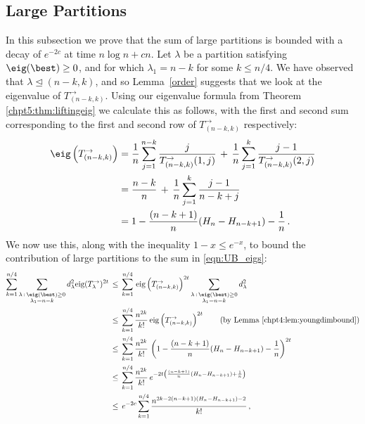 \documentclass[11pt]{report}
\begin{document}
\subsection{Large Partitions}
In this subsection we prove that the sum of large partitions is bounded 
with a decay of $e^{-2c}$ at time $n \log n +cn$. 
Let $\lambda$ be a partition satisfying $\eig(\best)\ge 0$, and for which $\lambda_1 = n-k$ for some  $k\leq n/4$. We have observed that $\lambda \trianglelefteq(n-k,k)$, and so Lemma~\ref{order} suggests that we look at the eigenvalue of $T_{(n-k,k)}^{\rightarrow}$. Using our eigenvalue formula from Theorem \ref{chpt5:thm:liftingeig} we calculate this as follows, with the first and second sum corresponding to the first and second row of $T_{(n-k,k)}^{\rightarrow}$ respectively:
\begin{align}
\eig\left(T_{(n-k,k)}^{\rightarrow}\right) & = \frac 1n \sum_{j=1}^{n-k} 
\frac{j}{T_{(n-k,k)}^{\rightarrow}(1,j)} 
\,+\, \frac 1n\sum_{j=1}^{k} 
\frac{j-1}{T_{(n-k,k)}^{\rightarrow}(2,j)}\nonumber \\
&=
\frac{n-k}{n} \,+\, \frac 1n \sum_{j=1}^{k} 
\frac{j-1}{n-k+j} \label{eqn:large} \\
&=  1 -\frac{(n-k+1)}{n}(H_{n}-H_{n-k+1}) - \frac 1n \,.
\end{align}
We now use this, along with the inequality $1-x \leq e^{-x}$, to bound the contribution of large partitions to the sum in \eqref{eqn:UB_eigs}:
\begin{align}
\sum_{k=1}^{n/4}
\sum_{\substack{\lambda\,:\,\eig(\best)\ge 0\\ \lambda_{1}=n-k}} 
d_{\lambda}^{2} \text{eig}(T_{\lambda}^{\rightarrow})^{2t}
& \, \leq\, \sum_{k=1}^{n/4} \,
\text{eig}\left(T_{(n-k,k)}^{\rightarrow}\right)^{2t} 
\sum_{\substack{\lambda\,:\,\eig(\best)\ge 0\\ \lambda_{1}=n-k}} 
d_{\lambda}^{2}\nonumber \\
& \, \leq\,   	\sum_{k=1}^{n/4} \frac{n^{2k}}{k!}\,
\text{eig}\left(T_{(n-k,k)}^{\rightarrow}\right)^{2t}  \qquad\text{(by Lemma \ref{chpt4:lem:youngdimbound})} \nonumber \\
& \,\leq\, 	\sum_{k=1}^{n/4} \frac{n^{2k}}{k!}\, \left( 1 
-\frac{(n-k+1)}{n}(H_{n}-H_{n-k+1}) - \frac{1}{n}\right)^{2t} \nonumber \\
& \,\leq\, 	\sum_{k=1}^{n/4}  \frac{n^{2k}}{k!}\, e^{-2t\left(\frac{(n-k+1)}{n}(H_{n}-H_{n-k+1})+ 
	\frac{1}{n}\right)} \nonumber \\
& \,\leq\,  e^{-2c}	\sum_{k=1}^{n/4}
\frac{n^{2k-2(n-k+1)(H_{n}-H_{n-k+1})-2}}{k!}\,, \label{sum_large}
\end{align}
\end{document}
